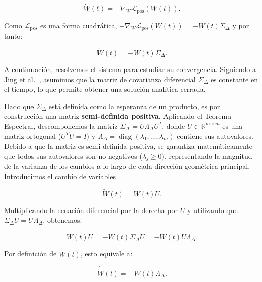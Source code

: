 \begin{equation}
    \dot{W}(t) = -\nabla_W \mathcal{L}_{\text{pos}}(W(t)).
\end{equation}

Como $\mathcal{L}_{\text{pos}}$ es una forma cuadrática, $-\nabla_W \mathcal{L}_{\text{pos}}(W(t))= -W(t) \Sigma_{\Delta}$ y por tanto:

\begin{equation}
    \dot{W}(t) = -W(t) \Sigma_{\Delta}.
\end{equation}

A continuación, resolvemos el sistema para estudiar su convergencia. Siguiendo a Jing et al.~\cite{jing2022understanding}, asumimos que la matriz de covarianza diferencial $\Sigma_{\Delta}$ es constante en el tiempo, lo que permite obtener una solución analítica cerrada.

Dado que $\Sigma_{\Delta}$ está definida como la esperanza de un producto, es por construcción una matriz \textbf{semi-definida positiva}. Aplicando el Teorema Espectral, descomponemos la matriz $\Sigma_{\Delta} = U \Lambda_{\Delta} U^T$, donde $U \in \mathbb{R}^{m \times m}$ es una matriz ortogonal ($U^T U = I$) y $\Lambda_{\Delta} = \operatorname{diag}(\lambda_1, \dots, \lambda_m)$ contiene sus autovalores. Debido a que la matriz es semi-definida positiva, se garantiza matemáticamente que todos sus autovalores son no negativos ($\lambda_j \ge 0$), representando la magnitud de la varianza de los cambios a lo largo de cada dirección geométrica principal. Introducimos el cambio de variables

\begin{equation}
    \tilde{W}(t) = W(t)U.
\end{equation}

Multiplicando la ecuación diferencial por la derecha por $U$ y utilizando que
$\Sigma_{\Delta}U = U\Lambda_{\Delta}$, obtenemos:

\begin{equation}
    \dot{W}(t)U
    = -W(t)\Sigma_{\Delta}U
    = -W(t)U\Lambda_{\Delta}.
\end{equation}

Por definición de $\tilde{W}(t)$, esto equivale a:

\begin{equation}
    \dot{\tilde{W}}(t)
    = -\tilde{W}(t)\Lambda_{\Delta}.
\end{equation}

